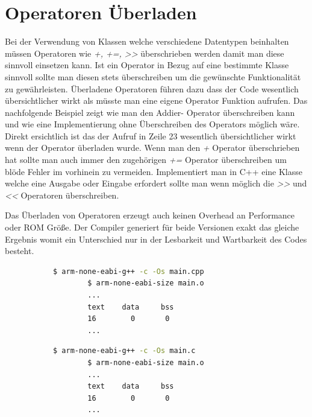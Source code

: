 \documentclass[MES,Master,ngerman]{twbook}%
\begin{document}
\newpage
\section{Operatoren Überladen}
Bei der Verwendung von Klassen welche verschiedene Datentypen beinhalten müssen Operatoren wie \textit{+, +=, >>} überschrieben werden damit man diese sinnvoll einsetzen kann. Ist ein Operator in Bezug auf eine bestimmte Klasse sinnvoll sollte man diesen stets überschreiben um die gewünschte Funktionalität zu gewährleisten. Überladene Operatoren führen dazu dass der Code wesentlich übersichtlicher wirkt als müsste man eine eigene Operator Funktion aufrufen. Das nachfolgende Beispiel zeigt wie man den Addier- Operator überschreiben kann und wie eine Implementierung ohne Überschreiben des Operators möglich wäre. Direkt ersichtlich ist das der Aufruf in Zeile 23 wesentlich übersichtlicher wirkt wenn der Operator überladen wurde. Wenn man den \textit{+} Operator überschrieben hat sollte man auch immer den zugehörigen \textit{+=} Operator überschreiben um blöde Fehler im vorhinein zu vermeiden. Implementiert man in C++ eine Klasse welche eine Ausgabe oder Eingabe erfordert sollte man wenn möglich die \textit{>>} und \textit{<<} Operatoren überschreiben. 

 \begin{figure}[!htb]
	\begin{subfigure}[b]{0.5\textwidth}
		
		\label{fig:44}
	\end{subfigure}
	\begin{subfigure}[b]{0.5\textwidth}
		
		\label{fig:45}
	\end{subfigure}
\end{figure}
\newpage

Das Überladen von Operatoren erzeugt auch keinen Overhead an Performance oder ROM Größe. Der Compiler generiert für beide Versionen exakt das gleiche Ergebnis womit ein Unterschied nur in der Lesbarkeit und Wartbarkeit des Codes besteht.

\begin{figure}[!htb]
	\begin{subfigure}[b]{0.5\textwidth}
		\begin{lstlisting}[gobble=6, title={Analyse Operator Überladen}, language=bash, numbers=none]
		$ arm-none-eabi-g++ -c -Os main.cpp
		$ arm-none-eabi-size main.o
		...
		text    data     bss
		16        0       0
		...
		\end{lstlisting}
	\end{subfigure}
	\begin{subfigure}[b]{0.5\textwidth}
		\begin{lstlisting}[gobble=6, title={Analyse Addier Mehode}, language=bash, numbers=none]
		$ arm-none-eabi-g++ -c -Os main.c
		$ arm-none-eabi-size main.o
		...
		text    data     bss
		16        0       0
		...
		\end{lstlisting}
	\end{subfigure}
\end{figure}
\end{document}
